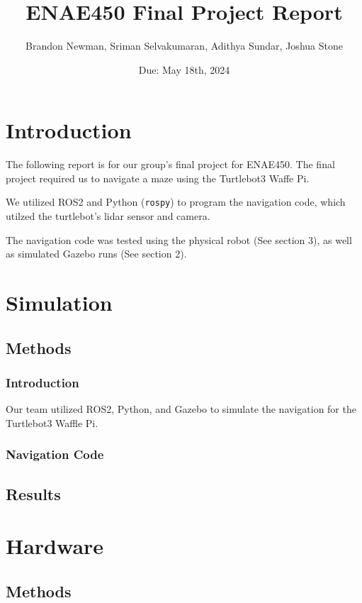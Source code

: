 \documentclass{article}
\title{ENAE450 Final Project Report}
\author{Brandon Newman, Sriman Selvakumaran, Adithya Sundar, Joshua Stone}
\date{Due: May 18th, 2024}
\begin{document}
\maketitle

\section{Introduction}

The following report is for our group's final project for ENAE450. The final project required us to navigate a maze using the Turtlebot3 Waffe Pi. \par
We utilized ROS2 and Python (\verb|rospy|) to program the navigation code, which utilzed the turtlebot's lidar sensor and camera. \par
The navigation code was tested using the physical robot (See section 3), as well as simulated Gazebo runs (See section 2). 

\section{Simulation}

\subsection{Methods}

\subsubsection{Introduction}

Our team utilized ROS2, Python, and Gazebo to simulate the navigation for the Turtlebot3 Waffle Pi.

\subsubsection{Navigation Code}

\subsection{Results}

\section{Hardware}

\subsection{Methods}
\end{document}
